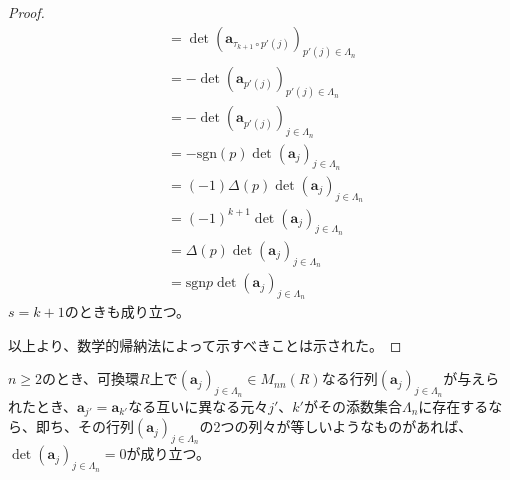 \documentclass[dvipdfmx]{jsarticle}
\begin{document}
\begin{proof}
\begin{align*}
&= \det\left( \mathbf{a}_{\tau_{k + 1} \circ p'(j)} \right)_{p'(j) \in \varLambda_{n}}\\
&= - \det\left( \mathbf{a}_{p'(j)} \right)_{p'(j) \in \varLambda_{n}}\\
&= - \det\left( \mathbf{a}_{p'(j)} \right)_{j \in \varLambda_{n}}\\
&= - {\mathrm{sgn} }(p)\det\left( \mathbf{a}_{j} \right)_{j \in \varLambda_{n}}\\
&= ( - 1)\Delta(p)\det\left( \mathbf{a}_{j} \right)_{j \in \varLambda_{n}}\\
&= ( - 1)^{k + 1}\det\left( \mathbf{a}_{j} \right)_{j \in \varLambda_{n}}\\
&= \Delta(p)\det\left( \mathbf{a}_{j} \right)_{j \in \varLambda_{n}}\\
&= {\mathrm{sgn} }p\det\left( \mathbf{a}_{j} \right)_{j \in \varLambda_{n}}
\end{align*}
$s = k + 1$のときも成り立つ。\par
以上より、数学的帰納法によって示すべきことは示された。
\end{proof}
\begin{thm}\label{2.1.11.4}
$n \geq 2$のとき、可換環$R$上で$\left( \mathbf{a}_{j} \right)_{j \in \varLambda_{n}} \in M_{nn}(R)$なる行列$\left( \mathbf{a}_{j} \right)_{j \in \varLambda_{n}}$が与えられたとき、$\mathbf{a}_{j'} = \mathbf{a}_{k'}$なる互いに異なる元々$j'$、$k'$がその添数集合$\varLambda_{n}$に存在するなら、即ち、その行列$\left( \mathbf{a}_{j} \right)_{j \in \varLambda_{n}}$の2つの列々が等しいようなものがあれば、$\det\left( \mathbf{a}_{j} \right)_{j \in \varLambda_{n}} = 0$が成り立つ。
\end{thm}
\end{document}
